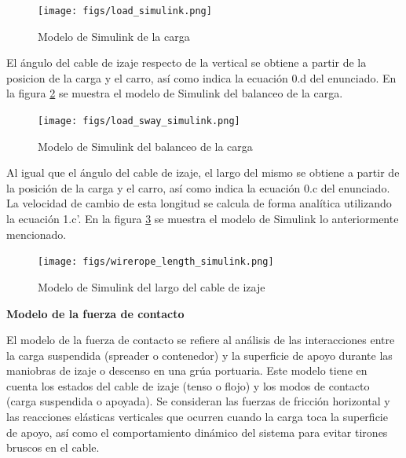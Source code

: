 \documentclass{article}
\begin{document}
            \begin{figure} [H]
                \centering
                \texttt{[image: figs/load\_simulink.png]}
                \caption{Modelo de Simulink de la carga}
                \label{fig:load_simulink}
            \end{figure}

            El ángulo del cable de izaje respecto de la vertical se obtiene a partir de la posicion de la carga y el carro, así como indica la ecuación 0.d del enunciado. En la figura \ref{fig:load_sway_simulink} se muestra el modelo de Simulink del balanceo de la carga.

            \begin{figure} [H]
                \centering
                \texttt{[image: figs/load\_sway\_simulink.png]}
                \caption{Modelo de Simulink del balanceo de la carga}
                \label{fig:load_sway_simulink}
            \end{figure}

            Al igual que el ángulo del cable de izaje, el largo del mismo se obtiene a partir de la posición de la carga y el carro, así como indica la ecuación 0.c del enunciado. La velocidad de cambio de esta longitud se calcula de forma analítica utilizando la ecuación 1.c'. En la figura \ref{fig:wirerope_length_simulink} se muestra el modelo de Simulink lo anteriormente mencionado.

            \begin{figure} [H]
                \centering
                \texttt{[image: figs/wirerope\_length\_simulink.png]}
                \caption{Modelo de Simulink del largo del cable de izaje}
                \label{fig:wirerope_length_simulink}
            \end{figure}

            \textbf{Modelo de la fuerza de contacto}

            El modelo de la fuerza de contacto se refiere al análisis de las interacciones entre la carga suspendida (spreader o contenedor) y la superficie de apoyo durante las maniobras de izaje o descenso en una grúa portuaria. Este modelo tiene en cuenta los estados del cable de izaje (tenso o flojo) y los modos de contacto (carga suspendida o apoyada). Se consideran las fuerzas de fricción horizontal y las reacciones elásticas verticales que ocurren cuando la carga toca la superficie de apoyo, así como el comportamiento dinámico del sistema para evitar tirones bruscos en el cable.
\end{document}
